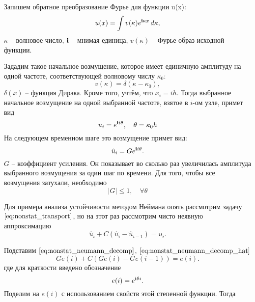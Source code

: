 Запишем обратное преобразование Фурье для функции u(x):
\begin{equation*}
    u(x) = \int v(\kappa) e^{\mathbf{i} \kappa x} \, d\kappa,
\end{equation*}
$\kappa$ -- волновое число, $\mathbf{i}$ -- мнимая единица, $v(\kappa)$ -- Фурье образ исходной функции.

Зададим такое начальное возмущение, которое имеет единичную амплитуду 
на одной частоте, соответствующей волновому числу $\kappa_0$:
\begin{equation*}
    v(\kappa) = \delta(\kappa - \kappa_0),
\end{equation*}
$\delta(x)$ -- функция Дирака.
Кроме того, учтём, что $x_i = ih$.
Тогда выбранное начальное возмущение на одной выбранной частоте, взятое в $i$-ом узле, примет вид
\begin{equation}
    \label{eq:nonstat_neumann_decomp}
    u_i = e^{\mathbf{i} i \theta}, \quad \theta = \kappa_0 h
\end{equation}
На следующем временном шаге это возмущение примет вид:
\begin{equation}
    \label{eq:nonstat_neumann_decomp_hat}
    \hat u_i = G e^{\mathbf{i} i \theta}.
\end{equation}
$G$ -- коэффициент усиления. Он показывает во сколько раз
увеличилась амплитуда выбранного возмущения за один шаг по времени.
Для того, чтобы все возмущения затухали, необходимо
\begin{equation*}
    |G| \leq 1, \quad \forall \theta
\end{equation*}

\label{sec:NonstatImpConv}

Для примера анализа устойчивости методом Неймана опять рассмотрим задачу $\eqref{eq:nonstat_transport}$,
но на этот раз рассмотрим чисто неявную аппроксимацию
\begin{equation}
    \label{eq:nonstat_implicit_transport}
    \hat u_i + C \left(\hat u_i - \hat u_{i-1}\right) = u_i.
\end{equation}

Подставим $\eqref{eq:nonstat_neumann_decomp}$, $\eqref{eq:nonstat_neumann_decomp_hat}$
\begin{equation*}
    G e(i) + C \left(G e(i) - G e(i-1)\right)= e(i). 
\end{equation*}
где для краткости введено обозначение
\begin{equation*}
    e(i) = e^{\mathbf{i} \theta i}.
\end{equation*}
Поделим на $e(i)$ с использованием свойств этой степенной функции. Тогда


